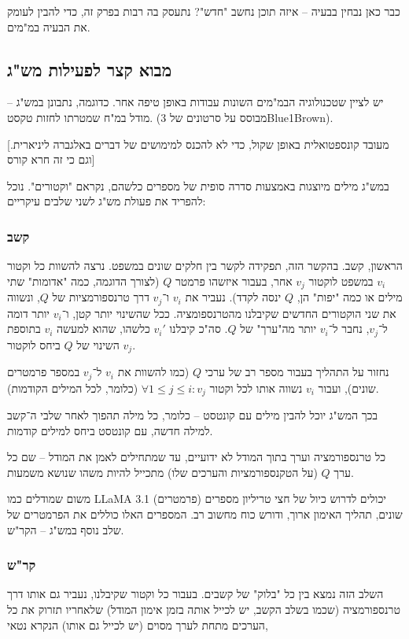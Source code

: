 \documentclass[]{article}
\theoremstyle{definition}
\begin{document}
	כבר כאן נבחין בבעיה – איזה תוכן נחשב "חדש"? נתעסק בה רבות בפרק זה, כדי להבין לעומק את הבעיה במ"מים. 
	
	\subsection{מבוא קצר לפעילות מש"ג}
	יש לציין שטכנולוגיה הבמ"מים השונות עבודות באופן טיפה אחר. כדוגמה, נתבונן במש"ג – מודל במ"ח שמטרתו לחזות טקסט. 
	(מבוסס על סרטונים של 3Blue1Brown). 
	
	[מעובד קונספטואלית באופן שקול, כדי לא להכנס למימושים של דברים באלגברה ליניארית. וגם כי זה חרא קורס]
	
	במש"ג מילים מיוצגות באמצעות סדרה סופית של מספרים כלשהם, נקראם "וקטורים". נוכל להפריד את פעולת מש"ג לשני שלבים עיקריים: 
	\subsubsection{קשב}
	
	 הראשון, קשב. בהקשר הזה, תפקידה לקשר בין חלקים שונים במשפט. נרצה להשוות כל וקטור $v_i$ במשפט לוקטור $v_j$ אחר, בעבור איזשהו פרמטר $Q$ (לצורך הדוגמה, כמה "אדומות" שתי מילים או כמה "יפות" הן, $Q$ ינסה לקדד). נעביר את $v_i$ ו־$v_j$ דרך טרנספורמציות של $Q$, ונשווה את שני הוקטורים החדשים שקיבלנו מהטרנספומציה. ככל שהשינוי יותר קטן, ו־$v_i$ יותר דומה ל־$v_j$, נחבר ל־$v_i$ יותר מה"ערך" של $Q$. סה"כ קיבלנו $v_i'$ כלשהו, שהוא למעשה $v_i$ בתוספת השינוי של $Q$ ביחס לוקטור $v_j$. 
		
		נחזור על התהליך בעבור מספר רב של ערכי $Q$ (כמו להשוות את $v_i$ ל־$v_j$ במספר פרמטרים שונים), ועבור $v_i$ נשווה אותו לכל וקטור $\forall 1 \le j \le i \colon v_j$ (כלומר, לכל המילים הקודמות). 
		
		בכך המש"ג יוכל להבין מילים עם קונטסט – כלומר, כל מילה תהפוך לאחר שלבי ה־קשב למילה חדשה, עם קונטסט ביחס למילים קודמות. 
		
		כל טרנספורמציה וערך בתוך המודל לא ידועיים, עד שמתחילים לאמן את המודל – שם כל ערך $Q$ (על הטקנספורמציות והערכים שלו) מתכייל להיות משהו שנושא משמעות. 
		
		משום שמודלים כמו LLaMA 3.1 יכולים לדרוש כיול של חצי טריליון מספרים (פרמטרים) שונים, תהליך האימון ארוך, ודורש כוח מחשוב רב. המספרים האלו כוללים את הפרמטרים של שלב נוסף במש"ג – הקר"ש. 
	\subsubsection{קר"ש}
	השלב הזה נמצא בין כל "בלוק" של קשבים. בעבור כל וקטור שקיבלנו, נעביר גם אותו דרך טרנספורמציה (שכמו בשלב הקשב, יש לכייל אותה בזמן אימון המודל) שלאחריו תזרוק את כל הערכים מתחת לערך מסוים (יש לכייל גם אותו) הנקרא נטאי, 
	
\end{document}
